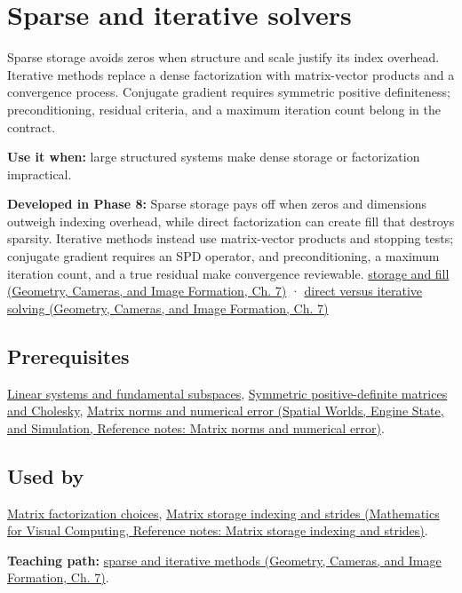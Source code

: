 \hypertarget{appendix-67c87a3d9e94}{}\label{referencestart:appendix-67c87a3d9e94}
\section{Sparse and iterative solvers}\label{appendix-67c87a3d9e94-sparse-and-iterative-solvers}

Sparse storage avoids zeros when structure and scale justify its index overhead. Iterative methods replace a dense factorization with matrix-vector products and a convergence process. Conjugate gradient requires symmetric positive definiteness; preconditioning, residual criteria, and a maximum iteration count belong in the contract.

\textbf{Use it when:} large structured systems make dense storage or factorization impractical.

\textbf{Developed in Phase 8:} Sparse storage pays off when zeros and dimensions outweigh indexing overhead, while direct factorization can create fill that destroys sparsity. Iterative methods instead use matrix-vector products and stopping tests; conjugate gradient requires an SPD operator, and preconditioning, a maximum iteration count, and a true residual make convergence reviewable. \href{../03-Geometry-Cameras-and-Image-Formation/main.pdf\#nameddest=02-foundations-ii-ch038-sparse-storage-changes-the-cost-model}{storage and fill (Geometry, Cameras, and Image Formation, Ch. 7)} · \href{../03-Geometry-Cameras-and-Image-Formation/main.pdf\#nameddest=02-foundations-ii-ch038-direct-and-iterative-solvers-suit-different-workloads}{direct versus iterative solving (Geometry, Cameras, and Image Formation, Ch. 7)}

\subsection{Prerequisites}\label{appendix-67c87a3d9e94-prerequisites}

\hyperref[appendix-8572a4a060c1]{Linear systems and fundamental subspaces}, \hyperref[appendix-50d2ea3c9b26]{Symmetric positive-definite matrices and Cholesky}, \href{../05-Spatial-Worlds-Engine-State-and-Simulation/main.pdf\#nameddest=appendix-f8657bac66e5}{Matrix norms and numerical error (Spatial Worlds, Engine State, and Simulation, Reference notes: Matrix norms and numerical error)}.

\subsection{Used by}\label{appendix-67c87a3d9e94-used-by}

\hyperref[appendix-221a483bec2d]{Matrix factorization choices}, \href{../02-Mathematics-for-Visual-Computing/main.pdf\#nameddest=appendix-ffdc1d4e5350}{Matrix storage indexing and strides (Mathematics for Visual Computing, Reference notes: Matrix storage indexing and strides)}.

\textbf{Teaching path:} \href{../03-Geometry-Cameras-and-Image-Formation/main.pdf\#nameddest=02-foundations-ii-ch038-sparse-problems-change-the-economics-of-solving}{sparse and iterative methods (Geometry, Cameras, and Image Formation, Ch. 7)}.
